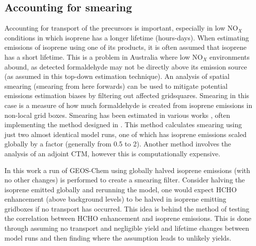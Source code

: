   \subsection{Accounting for smearing}
    \label{BioIsop:Method:Smearing}
    
    Accounting for transport of the precursors is important, especially in low NO$_X$ conditions in which isoprene has a longer lifetime (hours-days).
    When estimating emissions of isoprene using one of its products, it is often assumed that isoprene has a short lifetime.
    This is a problem in Australia where low NO$_X$ environments abound, as detected formaldehyde may not be directly above its emission source (as assumed in this top-down estimation technique).
    An analysis of spatial smearing (smearing from here forwards) can be used to mitigate potential emissions estimation biases by filtering out affected gridsquares.
    Smearing in this case is a measure of how much formaldehyde is created from isoprene emissions in non-local grid boxes.
    Smearing has been estimated in various works \parencite[eg.][]{Martin2003, Palmer2003, Millet2006, Stavrakou2009, Marais2012, Barkley2013, Zhu2014, Wolfe2016, Surl2018}, often implementing the method designed in \textcite{Palmer2003}.
    This method calculates smearing using just two almost identical model runs, one of which has isoprene emissions scaled globally by a factor (generally from 0.5 to 2).
    Another method \parencite[eg.][]{Stavrakou2009} involves the analysis of an adjoint CTM, however this is computationally expensive.
    
    In this work a run of GEOS-Chem using globally halved isoprene emissions (with no other changes) is performed to create a smearing filter.
    Consider halving the isoprene emitted globally and rerunning the model, one would expect HCHO enhancement (above background levels) to be halved in isoprene emitting gridboxes if no transport has occurred.
    This idea is behind the method of testing the correlation between HCHO enhancement and isoprene emissions.
    This is done through assuming no transport and negligible yield and lifetime changes between model runs and then finding where the assumption leads to unlikely yields.
    
